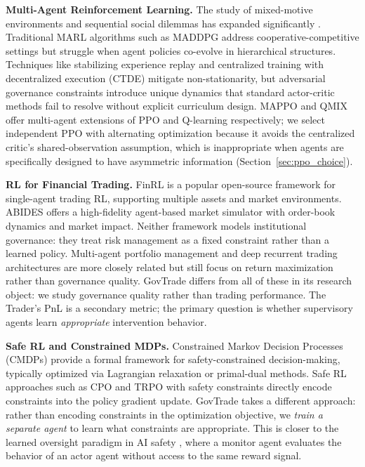 \documentclass[11pt]{article}
\begin{document}
\textbf{Multi-Agent Reinforcement Learning.}
The study of mixed-motive environments and sequential social dilemmas has expanded significantly \cite{leibo2017multi}. Traditional MARL algorithms such as MADDPG \cite{lowe2017multi} address cooperative-competitive settings but struggle when agent policies co-evolve in hierarchical structures. Techniques like stabilizing experience replay \cite{foerster2017stabilising} and centralized training with decentralized execution (CTDE) mitigate non-stationarity, but adversarial governance constraints introduce unique dynamics that standard actor-critic methods fail to resolve without explicit curriculum design. MAPPO \cite{yu2021mappo} and QMIX \cite{rashid2018qmix} offer multi-agent extensions of PPO and Q-learning respectively; we select independent PPO with alternating optimization because it avoids the centralized critic's shared-observation assumption, which is inappropriate when agents are specifically designed to have asymmetric information (Section~\ref{sec:ppo_choice}).

\textbf{RL for Financial Trading.}
FinRL \cite{liu2021finrl} is a popular open-source framework for single-agent trading RL, supporting multiple assets and market environments. ABIDES \cite{byrd2020abides} offers a high-fidelity agent-based market simulator with order-book dynamics and market impact. Neither framework models institutional governance: they treat risk management as a fixed constraint rather than a learned policy. Multi-agent portfolio management \cite{lee2021multiagent} and deep recurrent trading architectures \cite{deng2016deep} are more closely related but still focus on return maximization rather than governance quality. GovTrade differs from all of these in its research object: we study governance quality rather than trading performance. The Trader's PnL is a secondary metric; the primary question is whether supervisory agents learn \emph{appropriate} intervention behavior.

\textbf{Safe RL and Constrained MDPs.}
Constrained Markov Decision Processes (CMDPs) \cite{altman1999constrained} provide a formal framework for safety-constrained decision-making, typically optimized via Lagrangian relaxation or primal-dual methods. Safe RL approaches such as CPO \cite{achiam2017constrained} and TRPO with safety constraints directly encode constraints into the policy gradient update. GovTrade takes a different approach: rather than encoding constraints in the optimization objective, we \emph{train a separate agent} to learn what constraints are appropriate. This is closer to the learned oversight paradigm in AI safety \cite{amodei2016concrete}, where a monitor agent evaluates the behavior of an actor agent without access to the same reward signal.
\end{document}
